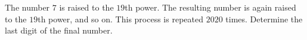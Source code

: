 The number $7$ is raised to the $19$th power. The resulting number is again raised to the $19$th power, and so on. This process is repeated $2020$ times. Determine the last digit of the final number.
